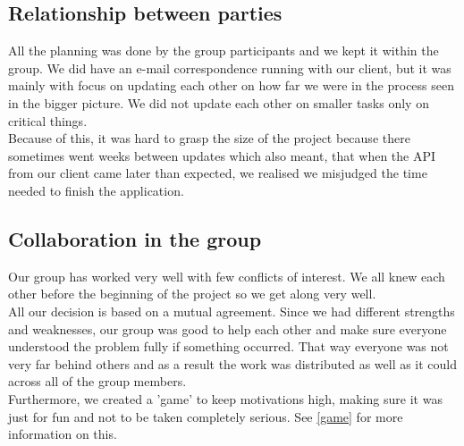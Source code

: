 \documentclass[12pt]{article}
\begin{document}
\subsection{Relationship between parties}
All the planning was done by the group participants and we kept it within the group. We did have an e-mail correspondence running with our client, but it was mainly with focus on updating each other on how far we were in the process seen in the bigger picture. We did not update each other on smaller tasks only on critical things.\\
Because of this, it was hard to grasp the size of the project because there sometimes went weeks between updates which also meant, that when the API from our client came later than expected, we realised we misjudged the time needed to finish the application.\\

\subsection{Collaboration in the group}
Our group has worked very well with few conflicts of interest. We all knew each other before the beginning of the project so we get along very well.\\
All our decision is based on a mutual agreement. Since we had different strengths and weaknesses, our group was good to help each other and make sure everyone understood the problem fully if something occurred. That way everyone was not very far behind others and as a result the work was distributed as well as it could across all of the group members.\\
Furthermore, we created a 'game' to keep motivations high, making sure it was just for fun and not to be taken completely serious. See \ref{game} for more information on this.
\end{document}
